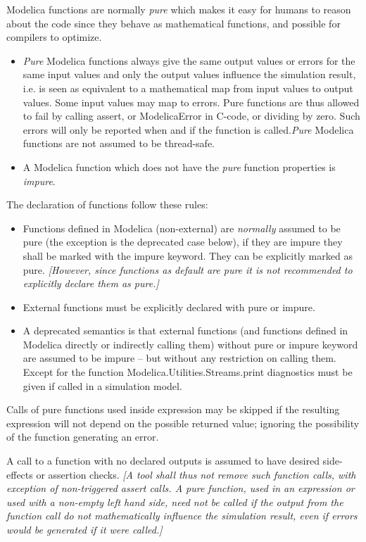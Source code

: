\documentclass[10pt,a4paper]{report}
\begin{document}
Modelica functions are normally \emph{pure} which makes it easy for
humans to reason about the code since they behave as mathematical
functions, and possible for compilers to optimize.

\begin{itemize}
\item
  \emph{Pure} Modelica functions always give the same output values or
  errors for the same input values and only the output values influence
  the simulation result, i.e. is seen as equivalent to a mathematical
  map from input values to output values. Some input values may map to
  errors. Pure functions are thus allowed to fail by calling assert, or
  ModelicaError in C-code, or dividing by zero. Such errors will only be
  reported when and if the function is called.\emph{Pure} Modelica
  functions are not assumed to be thread-safe.
\item
  A Modelica function which does not have the \emph{pure} function
  properties is \emph{impure}.
\end{itemize}

The declaration of functions follow these rules:

\begin{itemize}
\item
  Functions defined in Modelica (non-external) are \emph{normally}
  assumed to be pure (the exception is the deprecated case below), if
  they are impure they shall be marked with the impure keyword. They can
  be explicitly marked as pure. \emph{{[}However, since functions as
  default are pure it is not recommended to explicitly declare them as
  pure.{]}}
\item
  External functions must be explicitly declared with pure or impure.
\item
  A deprecated semantics is that external functions (and functions
  defined in Modelica directly or indirectly calling them) without pure
  or impure keyword are assumed to be impure -- but without any
  restriction on calling them. Except for the function
  Modelica.Utilities.Streams.print diagnostics must be given if called
  in a simulation model.
\end{itemize}

Calls of pure functions used inside expression may be skipped if the
resulting expression will not depend on the possible returned value;
ignoring the possibility of the function generating an error.

A call to a function with no declared outputs is assumed to have desired
side-effects or assertion checks. \emph{{[}A tool shall thus not remove
such function calls, with exception of non-triggered assert calls. A
pure function, used in an expression or used with a non-empty left hand
side, need not be called if the output from the function call do not
mathematically influence the simulation result, even if errors would be
generated if it were called.{]}}
\end{document}
